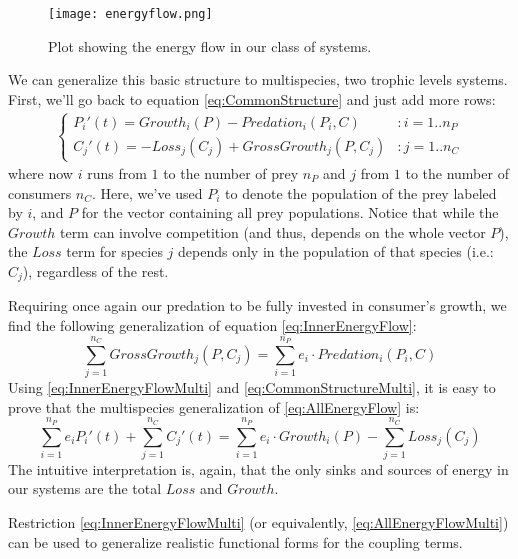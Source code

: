 \begin{figure}[H]
	\begin{center}
		\texttt{[image: energyflow.png]}
	\end{center}
	\caption{Plot showing the energy flow in our class of systems.}
	\label{fig:EnergyFlow}
\end{figure}

We can generalize this basic structure to multispecies, two trophic levels systems. First, we'll go back to equation \ref{eq:CommonStructure} and just add more rows:
%
\begin{eqnarray}
\label{eq:CommonStructureMulti}
	\begin{cases}
	P_i'(t) = Growth_i(P) - Predation_i(P_i,C) & : i = 1..n_P
	\\
	C_j'(t) = -Loss_j(C_j) + GrossGrowth_j(P,C_j) & : j = 1..n_C
	\end{cases}
\end{eqnarray}
%
where now $i$ runs from $1$ to the number of prey $n_P$ and $j$ from $1$ to the number of consumers $n_C$. Here, we've used $P_i$ to denote the population of the prey labeled by $i$, and $P$ for the vector containing all prey populations. Notice that while the $Growth$ term can involve competition (and thus, depends on the whole vector $P$), the $Loss$ term for species $j$ depends only in the population of that species (i.e.: $C_j$), regardless of the rest.

Requiring once again our predation to be fully invested in consumer's growth, we find the following generalization of equation \ref{eq:InnerEnergyFlow}:
%
\begin{equation}
\label{eq:InnerEnergyFlowMulti}
	\sum_{j = 1}^{n_C} GrossGrowth_j(P,C_j) = \sum_{i = 1}^{n_P} e_i \cdot Predation_i(P_i,C)
\end{equation}
%
Using \ref{eq:InnerEnergyFlowMulti} and \ref{eq:CommonStructureMulti}, it is easy to prove that the multispecies generalization of \ref{eq:AllEnergyFlow} is:
%
\begin{equation}
\label{eq:AllEnergyFlowMulti}
	\sum_{i = 1}^{n_P} e_i P_i'(t) + \sum_{j = 1}^{n_C} C_j'(t) = \sum_{i = 1}^{n_P} e_i \cdot Growth_i(P) - \sum_{j = 1}^{n_C} Loss_j(C_j)
\end{equation}
%
The intuitive interpretation is, again, that the only sinks and sources of energy in our systems are the total $Loss$ and $Growth$.

Restriction \ref{eq:InnerEnergyFlowMulti} (or equivalently, \ref{eq:AllEnergyFlowMulti}) can be used to generalize realistic functional forms for the coupling terms.

